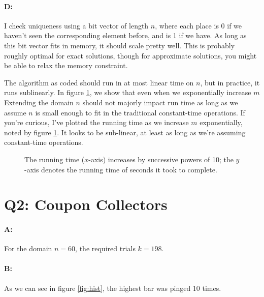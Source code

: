 \documentclass[11pt]{article}
\begin{document}
\paragraph*{D:} 

I check uniqueness using a bit vector of length $n$, where each place is 0 if we haven't seen the corresponding element before, and is 1 if we have. As long as this bit vector fits in memory, it should scale pretty well. This is probably roughly optimal for exact solutions, though for approximate solutions, you might be able to relax the memory constraint.

The algorithm as coded should run in at most linear time on $n$, but in practice, it runs sublinearly. In figure \ref{fig:runningtimes}, we show that even when we exponentially increase $m$  Extending the domain $n$ should not majorly impact run time as long as we assume $n$ is small enough to fit in the traditional constant-time operations. If you're curious, I've plotted the running time as we increase $m$ exponentially, noted by figure \ref{fig:runningtimes}. It looks to be sub-linear, at least as long as we're assuming constant-time operations.


\begin{figure}[h]
\caption{The running time ($x$-axis) increases by successive powers of 10; the $y$-axis denotes the running time of seconds it took to complete.}
\label{fig:runningtimes}
\end{figure}


\section{Q2: Coupon Collectors}

\paragraph*{A:} For the domain $n = 60$, the required trials $k = 198$.

\paragraph*{B:} As we can see in figure \ref{fig:hist}, the highest bar was pinged 10 times.
\end{document}
